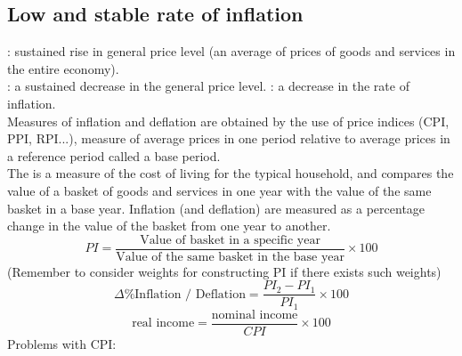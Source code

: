 \subsection{Low and stable rate of inflation}
: sustained rise in general price level (an average of prices of goods and services in the entire economy).\\
: a sustained decrease in the general price level.
: a decrease in the rate of inflation.\\
Measures of inflation and deflation are obtained by the use of price indices (CPI, PPI, RPI...), measure of average prices in one period relative to average prices in a reference period called a base period.\\
The  is a measure of the cost of living for the typical household, and compares the value of a basket of goods and services in one year with the value of the same basket in a base year. Inflation (and deflation) are measured as a percentage change in the value of the basket from one year to another.
\[PI=\dfrac{\text{Value of basket in a specific year}}{\text{Value of the same basket in the base year}}\times 100\]
(Remember to consider weights for constructing PI if there exists such weights)
\[\Delta \% \text{Inflation / Deflation}=\dfrac{PI_2-PI_1}{PI_1}\times 100\]
\[\text{real income}=\dfrac{\text{nominal income}}{CPI}\times 100\]
Problems with CPI:

